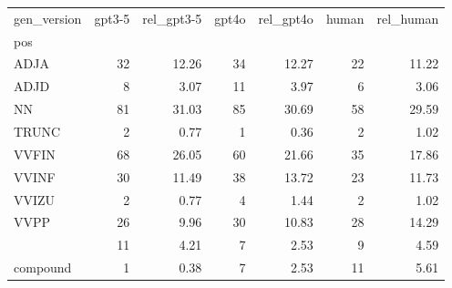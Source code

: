 \begin{tabular}{lrrrrrr}
\toprule
gen_version & gpt3-5 & rel_gpt3-5 & gpt4o & rel_gpt4o & human & rel_human \\
pos &  &  &  &  &  &  \\
\midrule
ADJA & 32 & 12.26 & 34 & 12.27 & 22 & 11.22 \\
ADJD & 8 & 3.07 & 11 & 3.97 & 6 & 3.06 \\
NN & 81 & 31.03 & 85 & 30.69 & 58 & 29.59 \\
TRUNC & 2 & 0.77 & 1 & 0.36 & 2 & 1.02 \\
VVFIN & 68 & 26.05 & 60 & 21.66 & 35 & 17.86 \\
VVINF & 30 & 11.49 & 38 & 13.72 & 23 & 11.73 \\
VVIZU & 2 & 0.77 & 4 & 1.44 & 2 & 1.02 \\
VVPP & 26 & 9.96 & 30 & 10.83 & 28 & 14.29 \\
[VVFIN, PTKVZ] & 11 & 4.21 & 7 & 2.53 & 9 & 4.59 \\
compound & 1 & 0.38 & 7 & 2.53 & 11 & 5.61 \\
\bottomrule
\end{tabular}
